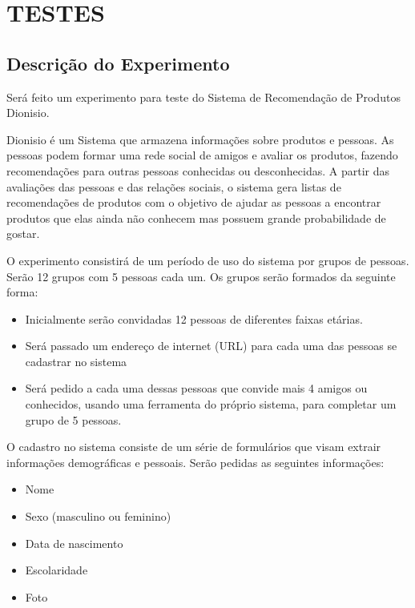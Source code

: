 \chapter{TESTES} %
\label{cha:testes} %

\section{Descrição do Experimento}
\label{cha:descricao_do_experimento}

 Será feito um experimento para teste do Sistema de Recomendação de Produtos Dionisio.

 Dionisio é um Sistema que armazena informações sobre produtos e pessoas. As pessoas podem formar uma rede social de amigos e avaliar os produtos, fazendo recomendações para outras pessoas conhecidas ou desconhecidas. A partir das avaliações das pessoas e das relações sociais, o sistema gera listas de recomendações de produtos com o objetivo de ajudar as pessoas a encontrar produtos que elas ainda não conhecem mas possuem grande probabilidade de gostar.

 O experimento consistirá de um período de uso do sistema por grupos de pessoas. Serão 12 grupos com 5 pessoas cada um. Os grupos serão formados da seguinte forma:

\begin{itemize}
	\item Inicialmente serão convidadas 12 pessoas de diferentes faixas etárias.
	\item Será passado um endereço de internet (URL) para cada uma das pessoas se cadastrar no sistema
	\item Será pedido a cada uma dessas pessoas que convide mais 4 amigos ou conhecidos, usando uma ferramenta do próprio sistema, para completar um grupo de 5 pessoas.
\end{itemize}

 O cadastro no sistema consiste de um série de formulários que visam extrair informações demográficas e pessoais. Serão pedidas as seguintes informações:
 
\begin{itemize}
	\item Nome
	\item Sexo (masculino ou feminino)
	\item Data de nascimento
	\item Escolaridade
	\item Foto
\end{itemize}

